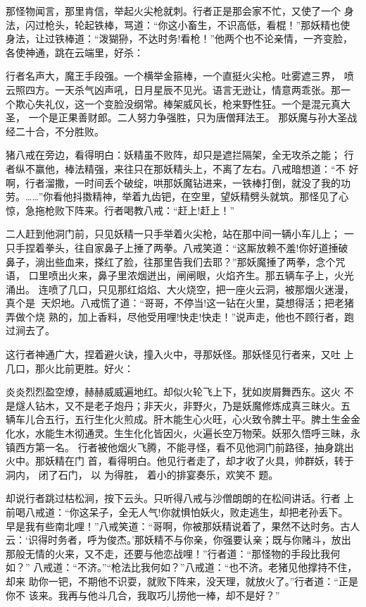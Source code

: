 那怪物闻言，那里肯信，举起火尖枪就刺。行者正是那会家不忙，又使了一个
身法，闪过枪头，轮起铁棒，骂道：“你这小畜生，不识高低，看棍！”那妖精也使
身法，让过铁棒道：“泼猢狲，不达时务!看枪！”他两个也不论亲情，一齐变脸，
各使神通，跳在云端里，好杀：

行者名声大，魔王手段强。一个横举金箍棒，一个直挺火尖枪。吐雾遮三界，
喷云照四方。一天杀气凶声吼，日月星辰不见光。语言无逊让，情意两乖张。那一
个欺心失礼仪，这一个变脸没纲常。棒架威风长，枪来野性狂。一个是混元真大圣，
一个是正果善财郎。二人努力争强胜，只为唐僧拜法王。
那妖魔与孙大圣战经二十合，不分胜败。

猪八戒在旁边，看得明白：妖精虽不败阵，却只是遮拦隔架，全无攻杀之能；
行者纵不赢他，棒法精强，来往只在那妖精头上，不离了左右。八戒暗想道：“不
好啊，行者溜撒，一时间丢个破绽，哄那妖魔钻进来，一铁棒打倒，就没了我的功
劳。……”你看他抖擞精神，举着九齿钯，在空里，望妖精劈头就筑。那怪见了心
惊，急拖枪败下阵来。行者喝教八戒：“赶上!赶上！”

二人赶到他洞门前，只见妖精一只手举着火尖枪，站在那中间一辆小车儿上；
一只手捏着拳头，往自家鼻子上捶了两拳。八戒笑道：“这厮放赖不羞!你好道捶破
鼻子，淌出些血来，搽红了脸，往那里告我们去耶？”那妖魔捶了两拳，念个咒语，
口里喷出火来，鼻子里浓烟迸出，闸闸眼，火焰齐生。那五辆车子上，火光涌出。
连喷了几口，只见那红焰焰、大火烧空，把一座火云洞，被那烟火迷漫，真个是
天炽地。八戒慌了道：“哥哥，不停当!这一钻在火里，莫想得活；把老猪弄做个烧
熟的，加上香料，尽他受用哩!快走!快走！”说声走，他也不顾行者，跑过涧去了。

这行者神通广大，捏着避火诀，撞入火中，寻那妖怪。那妖怪见行者来，又吐
上几口，那火比前更胜。好火：

炎炎烈烈盈空燎，赫赫威威遍地红。却似火轮飞上下，犹如炭屑舞西东。这火
不是燧人钻木，又不是老子炮丹；非天火，非野火，乃是妖魔修炼成真三昧火。五
辆车儿合五行，五行生化火煎成。肝木能生心火旺，心火致令脾土平。脾土生金金
化水，水能生木彻通灵。生生化化皆因火，火遍长空万物荣。妖邪久悟呼三昧，永
镇西方第一名。
行者被他烟火飞腾，不能寻怪，看不见他洞门前路径，抽身跳出火中。那妖精在门
首，看得明白。他见行者走了，却才收了火具，帅群妖，转于洞内， 闭了石门， 以
为得胜， 着小的排宴奏乐，欢笑不
题。

却说行者跳过枯松涧，按下云头。只听得八戒与沙僧朗朗的在松间讲话。行者
上前喝八戒道：“你这呆子，全无人气!你就惧怕妖火，败走逃生，却把老孙丢下。
早是我有些南北哩！”八戒笑道：“哥啊，你被那妖精说着了，果然不达时务。古人
云：‘识得时务者，呼为俊杰。’那妖精不与你亲，你强要认亲；既与你赌斗，放出
那般无情的火来，又不走，还要与他恋战哩！”行者道：“那怪物的手段比我何如？”
八戒道：“不济。”“枪法比我何如？”八戒道：“也不济。老猪见他撑持不住，却来
助你一钯，不期他不识耍，就败下阵来，没天理，就放火了。”行者道：“正是你不
该来。我再与他斗几合，我取巧儿捞他一棒，却不是好？”

